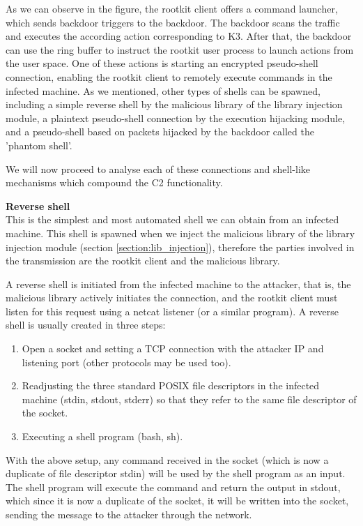 As we can observe in the figure, the rootkit client offers a command launcher, which sends backdoor triggers to the backdoor. The backdoor scans the traffic and executes the according action corresponding to K3. After that, the backdoor can use the ring buffer to instruct the rootkit user process to launch actions from the user space. One of these actions is starting an encrypted pseudo-shell connection, enabling the rootkit client to remotely execute commands in the infected machine. As we mentioned, other types of shells can be spawned, including a simple reverse shell by the malicious library of the library injection module, a plaintext pseudo-shell connection by the execution hijacking module, and a pseudo-shell based on packets hijacked by the backdoor called the 'phantom shell'. 

We will now proceed to analyse each of these connections and shell-like mechanisms which compound the C2 functionality.


\textbf{Reverse shell}\\
This is the simplest and most automated shell we can obtain from an infected machine. This shell is spawned when we inject the malicious library of the library injection module (section \ref{section:lib_injection}), therefore the parties involved in the transmission are the rootkit client and the malicious library.

A reverse shell is initiated from the infected machine to the attacker, that is, the malicious library actively initiates the connection, and the rootkit client must listen for this request using a netcat listener (or a similar program). A reverse shell is usually created in three steps:
\begin{enumerate}
\item Open a socket and setting a TCP connection with the attacker IP and listening port (other protocols may be used too).
\item Readjusting the three standard POSIX file descriptors in the infected machine (stdin, stdout, stderr) \cite{file_descriptors} so that they refer to the same file descriptor of the socket.
\item Executing a shell program (bash, sh).
\end{enumerate}

With the above setup, any command received in the socket (which is now a duplicate of file descriptor stdin) will be used by the shell program as an input. The shell program will execute the command and return the output in stdout, which since it is now a duplicate of the socket, it will be written into the socket, sending the message to the attacker through the network.

